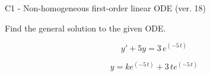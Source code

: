 \begin{exercise}
  \begin{exerciseTitle}C1 - Non-homogeneous first-order linear ODE (ver. 18)\end{exerciseTitle}
  \begin{exerciseStatement}
    
Find the general solution to the given ODE.

    
\[y'+5y= 3 \, e^{\left(-5 \, t\right)}\]

  \end{exerciseStatement}
  \begin{exerciseAnswer}
    
\[y= k e^{\left(-5 \, t\right)} + 3 \, t e^{\left(-5 \, t\right)}\]

  \end{exerciseAnswer}
\end{exercise}